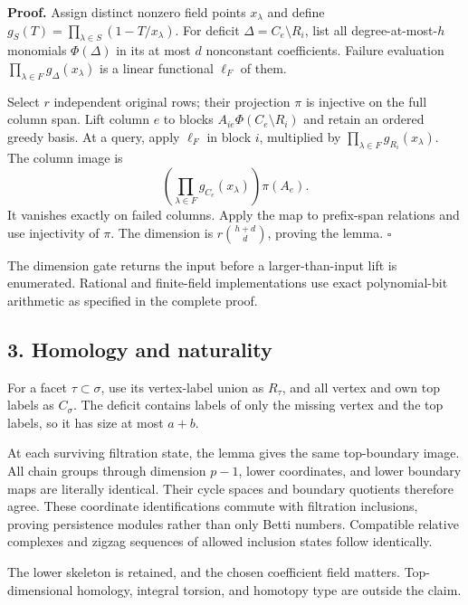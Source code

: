 \textbf{Proof.} Assign distinct nonzero field points \(x_\lambda\) and define \(g_S(T)=\prod_{\lambda\in S}(1-T/x_\lambda)\). For deficit \(\Delta=C_e\setminus R_i\), list all degree-at-most-\(h\) monomials \(\Phi(\Delta)\) in its at most \(d\) nonconstant coefficients. Failure evaluation \(\prod_{\lambda\in F}g_\Delta(x_\lambda)\) is a linear functional \(\ell_F\) of them.

Select \(r\) independent original rows; their projection \(\pi\) is injective on the full column span. Lift column \(e\) to blocks \(A_{ie}\Phi(C_e\setminus R_i)\) and retain an ordered greedy basis. At a query, apply \(\ell_F\) in block \(i\), multiplied by \(\prod_{\lambda\in F}g_{R_i}(x_\lambda)\). The column image is \[
\left(\prod_{\lambda\in F}g_{C_e}(x_\lambda)\right)\pi(A_e).
\] It vanishes exactly on failed columns. Apply the map to prefix-span relations and use injectivity of \(\pi\). The dimension is \(r\binom{h+d}{d}\), proving the lemma. \(\square\)

The dimension gate returns the input before a larger-than-input lift is enumerated. Rational and finite-field implementations use exact polynomial-bit arithmetic as specified in the complete proof.

\hypertarget{af-ca17aac320-homology-and-naturality}{%
\subsection{3. Homology and naturality}\label{af-ca17aac320-homology-and-naturality}}

For a facet \(\tau\subset\sigma\), use its vertex-label union as \(R_\tau\), and all vertex and own top labels as \(C_\sigma\). The deficit contains labels of only the missing vertex and the top labels, so it has size at most \(a+b\).

At each surviving filtration state, the lemma gives the same top-boundary image. All chain groups through dimension \(p-1\), lower coordinates, and lower boundary maps are literally identical. Their cycle spaces and boundary quotients therefore agree. These coordinate identifications commute with filtration inclusions, proving persistence modules rather than only Betti numbers. Compatible relative complexes and zigzag sequences of allowed inclusion states follow identically.

The lower skeleton is retained, and the chosen coefficient field matters. Top-dimensional homology, integral torsion, and homotopy type are outside the claim.


